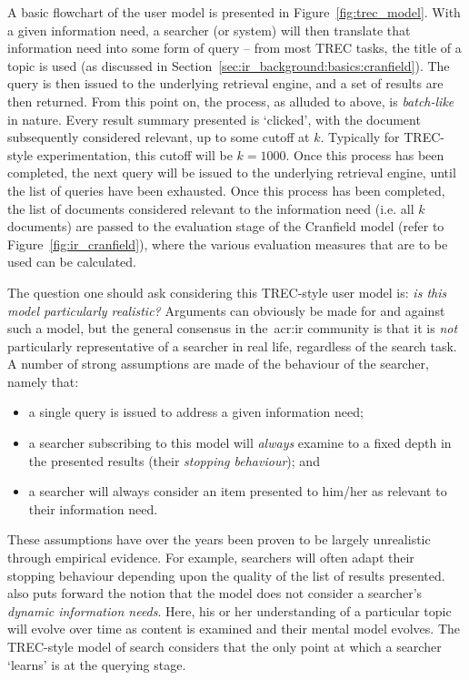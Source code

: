 A basic flowchart of the user model is presented in Figure~\ref{fig:trec_model}. With a given information need, a searcher (or system) will then translate that information need into some form of query -- from most TREC tasks, the title of a topic is used (as discussed in Section~\ref{sec:ir_background:basics:cranfield}). The query is then issued to the underlying retrieval engine, and a set of results are then returned. From this point on, the process, as alluded to above, is \emph{batch-like} in nature. Every result summary presented is `clicked', with the document subsequently considered relevant, up to some cutoff at $k$. Typically for TREC-style experimentation, this cutoff will be $k=1000$. Once this process has been completed, the next query will be issued to the underlying retrieval engine, until the list of queries have been exhausted. Once this process has been completed, the list of documents considered relevant to the information need (i.e. all $k$ documents) are passed to the evaluation stage of the Cranfield model (refer to Figure~\ref{fig:ir_cranfield}), where the various evaluation measures that are to be used can be calculated.

The question one should ask considering this TREC-style user model is: \emph{is this model particularly realistic?} Arguments can obviously be made for and against such a model, but the general consensus in the~\gls{acr:ir} community is that it is \emph{not} particularly representative of a searcher in real life, regardless of the search task. A number of strong assumptions are made of the behaviour of the searcher, namely that:

\begin{itemize}
    \item{a single query is issued to address a given information need;}
    \item{a searcher subscribing to this model will \emph{always} examine to a fixed depth in the presented results (their \emph{stopping behaviour}); and}
    \item{a searcher will always consider an item presented to him/her as relevant to their information need.}
\end{itemize}

These assumptions have over the years been proven to be largely unrealistic through empirical evidence. For example, searchers will often adapt their stopping behaviour depending upon the quality of the list of results presented.~\cite{borlund2003iir_model} also puts forward the notion that the model does not consider a searcher's \emph{dynamic information needs}. Here, his or her understanding of a particular topic will evolve over time as content is examined and their mental model evolves. The TREC-style model of search considers that the only point at which a searcher `learns' is at the querying stage.

